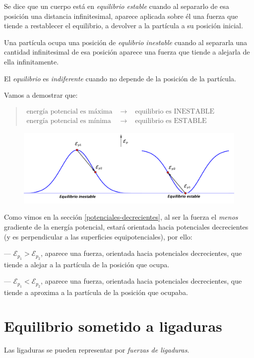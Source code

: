 Se dice que un cuerpo está en \emph{equilibrio estable} cuando al separarlo de esa posición una distancia infinitesimal, aparece aplicada sobre él una fuerza que tiende a restablecer el equilibrio, a devolver a la partícula a su posición inicial.

Una partícula ocupa una posición de \emph{equlibrio inestable} cuando al separarla una cantidad infinitesimal de esa posición aparece una fuerza que tiende a alejarla de ella infinitamente.

El \emph{equilibrio} es \emph{indiferente} cuando no depende de la posición de la partícula.

Vamos a demostrar que:
\vspace{-3mm}
\begin{quotation} %
	$\begin{array}{lcl}
\text{energía potencial es máxima }&\to&\text{ equilibrio es INESTABLE}	
\\
\text{energía potencial es mínima }&\to&\text{ equilibrio es ESTABLE}		
\end{array}$
\end{quotation}

\begin{figure}[H]
	\centering
	\includegraphics[width=.9\textwidth]{imagenes/imagenes05/T05IM03.png}
\end{figure}

Como vimos en la sección \ref{potenciales-decrecientes}, al ser la fuerza el \emph{menos} gradiente de la energía potencial, estará orientada hacia potenciales decrecientes (y es perpendicular a las superficies equipotenciales), por ello:

--- $\mathcal E_{p_1}>\mathcal E_{p_2}$, aparece una fuerza, orientada hacia potenciales decrecientes, que tiende a alejar a la partícula de la posición que ocupa.

--- $\mathcal E_{p_1}<\mathcal E_{p_2}$, aparece una fuerza, orientada hacia potenciales decrecientes, que tiende a aproxima a la partícula de la posición que ocupaba.

\section[Equilibrio de la partícula libre sometida a ligaduras]{Equilibrio sometido a ligaduras}
Las ligaduras se pueden representar por \emph{fuerzas de ligaduras}.

